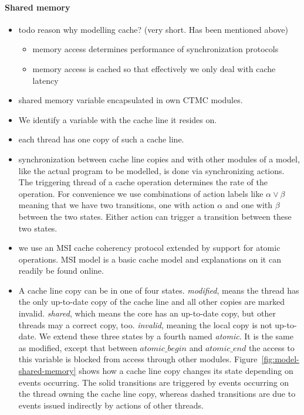 \documentclass[a4paper, 10pt]{article}
\begin{document}
\paragraph{Shared memory}
\label{sssec:analysis-modelchecking-modelling-shared-memory}
\begin{itemize}
	\item todo reason why modelling cache? (very short. Has been mentioned above)
		\begin{itemize}
			\item memory access determines performance of synchronization protocols
			\item memory access is cached so that effectively we only deal with cache latency
		\end{itemize}
	\item shared memory variable encapsulated in own CTMC modules.
	\item We identify a variable with the cache line it resides on.
	\item each thread has one copy of such a cache line.
	\item synchronization between cache line copies and with other modules of a model, like the actual program to be modelled, is done via synchronizing actions. The triggering thread of a cache operation determines the rate of the operation. For convenience we use combinations of action labels like $\alpha \lor \beta$ meaning that we have two transitions, one with action $\alpha$ and one with $\beta$ between the two states. Either action can trigger a transition between these two states.
	\item we use an MSI cache coherency protocol extended by support for atomic operations. MSI model is a basic cache model and explanations on it can readily be found online\cite{msi}.
	\item A cache line copy can be in one of four states. \emph{modified}, means the thread has the only up-to-date copy of the cache line and all other copies are marked invalid. \emph{shared}, which means the core has an up-to-date copy, but other threads may a correct copy, too. \emph{invalid}, meaning the local copy is not up-to-date. We extend these three states by a fourth named \emph{atomic}. It is the same as modified, except that between $\mathit{atomic\_begin}$ and $\mathit{atomic\_end}$ the access to this variable is blocked from access through other modules. Figure~\ref{fig:model-shared-memory} shows how a cache line copy changes its state depending on events occurring. The solid transitions are triggered by events occurring on the thread owning the cache line copy, whereas dashed transitions are due to events issued indirectly by actions of other threads.

\end{itemize}
\end{document}
